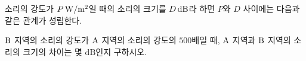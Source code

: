 소리의 강도가 $P\mkern3mu \mathrm{W/m^2}$일 때의 소리의 크기를 $D\mkern3mu \mathrm{dB}$라 하면 $P$와 $D$ 사이에는 다음과 같은 관계가 성립한다. \par\smallskip{}\par\smallskip\noindent $\mathrm{B}$ 지역의 소리의 강도가 $\mathrm{A}$ 지역의 소리의 강도의 $500$배일 때, $\mathrm{A}$ 지역과 $\mathrm{B}$ 지역의 소리의 크기의 차이는 몇 $\mathrm{dB}$인지 구하시오. 
